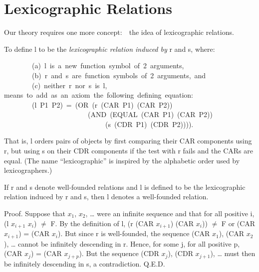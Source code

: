 \documentclass[11pt]{book}
\newenvironment{pubasis}{\begin{flushleft}\ttfamily\small}{\normalsize\rmfamily\end{flushleft}}
\newcommand{\pubinlineunderline}[1]{\emph{#1}}
\newcommand{\pubdefaulttextsize}{\large}
\begin{document}
\section{Lexicographic Relations}
\label{SSLEX}
\pubdefaulttextsize
Our theory requires one more concept:~~the
idea of lexicographic relations.
\par\pagebreak[0]\hrulefill\nopagebreak\par
To define l to be the \pubinlineunderline{lexicographic relation induced by} r and s, where:
\begin{pubasis}
~~~~~~~~(a)~l~is~a~new~function~symbol~of~2~arguments,\\
~~~~~~~~(b)~r~and~s~are~function~symbols~of~2~arguments,~and\\
~~~~~~~~(c)~neither~r~nor~s~is~l,\\

means~to~add~as~an~axiom~the~following~defining~equation:\\

~~~~~~~~(l~P1~P2)~=~(OR~(r~(CAR~P1)~(CAR~P2))\\
~~~~~~~~~~~~~~~~~~~~~~~~(AND~(EQUAL~(CAR~P1)~(CAR~P2))\\
~~~~~~~~~~~~~~~~~~~~~~~~~~~~~(s~(CDR~P1)~(CDR~P2)))).\\
\end{pubasis}
\nopagebreak\par\hrulefill\nopagebreak\par
That is, l orders pairs of objects by first comparing 
their CAR components using r, but  using s on their CDR components
if the test with r fails and the CARs are equal.
(The name ``lexicographic'' is inspired by the alphabetic
order used by lexicographers.)
\par\pagebreak[0]\hrulefill\nopagebreak\par
If r and s denote well-founded relations and l is defined to be
the lexicographic relation induced by r and s, then l denotes a well-founded
relation.
\nopagebreak\par\hrulefill\nopagebreak\par
Proof.  Suppose that $x_{1}$, $x_{2}$, \ldots{} were an
infinite sequence and that for all positive i, (l $x_{i+1}$ $x_{i}$) $\neq$ F.
By the definition of l, (r (CAR $x_{i+1}$) (CAR $x_{i}$)) $\neq$ F
or (CAR $x_{i+1}$) = (CAR $x_{i}$).  But since r is well-founded,
the sequence (CAR $x_{1}$), (CAR $x_{2}$), \ldots{} cannot be infinitely descending
in r.
Hence, for some j, for all positive p, (CAR $x_{j}$) = (CAR $x_{j+p}$).
But the sequence (CDR $x_{j}$), (CDR $x_{j+1}$), \ldots{} must then be infinitely
descending in s, a contradiction.  Q.E.D.
\end{document}
